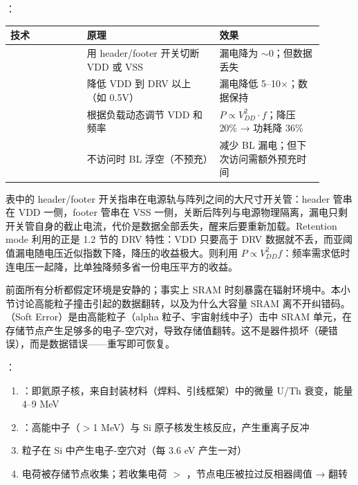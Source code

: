：

\begin{longtable}{L{0.22\linewidth}L{0.38\linewidth}L{0.30\linewidth}}
\toprule
技术 & 原理 & 效果 \\
\midrule
{} & 用 header/footer 开关切断 VDD 或 VSS & 漏电降为 $\sim$0；但数据丢失 \\
 & 降低 VDD 到 DRV 以上（如 0.5V） & 漏电降低 5--10$\times$；数据保持 \\
 & 根据负载动态调节 VDD 和频率 & $P \propto V_{DD}^2 \cdot f$；降压 20\% → 功耗降 36\% \\
 & 不访问时 BL 浮空（不预充） & 减少 BL 漏电；但下次访问需额外预充时间 \\
\bottomrule
\end{longtable}

表中的 header/footer 开关指串在电源轨与阵列之间的大尺寸开关管：header 管串在 VDD 一侧，footer 管串在 VSS 一侧，关断后阵列与电源物理隔离，漏电只剩开关管自身的截止电流，代价是数据全部丢失，醒来后要重新加载。Retention mode 利用的正是 1.2 节的 DRV 特性：VDD 只要高于 DRV 数据就不丢，而亚阈值漏电随电压近似指数下降，降压的收益极大。则利用 $P\propto V_{DD}^2 f$：频率需求低时连电压一起降，比单独降频多省一份电压平方的收益。


前面所有分析都假定环境是安静的；事实上 SRAM 时刻暴露在辐射环境中。本小节讨论高能粒子撞击引起的数据翻转，以及为什么大容量 SRAM 离不开纠错码。（Soft Error）是由高能粒子（alpha 粒子、宇宙射线中子）击中 SRAM 单元，在存储节点产生足够多的电子-空穴对，导致存储值翻转。这不是器件损坏（硬错误），而是数据错误——重写即可恢复。

：
\begin{enumerate}
  \item {}：即氦原子核，来自封装材料（焊料、引线框架）中的微量 U/Th 衰变，能量 4--9 MeV
  \item {}：高能中子（$>$1 MeV）与 Si 原子核发生核反应，产生重离子反冲
  \item 粒子在 Si 中产生电子-空穴对（每 3.6 eV 产生一对）
  \item 电荷被存储节点收集；若收集电荷 $>$ ，节点电压被拉过反相器阈值 → 翻转
\end{enumerate}

